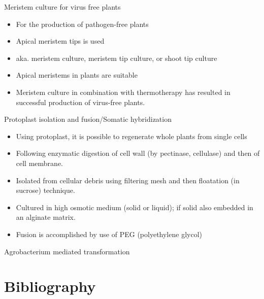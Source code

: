 \documentclass[ignorenonframetext,aspectratio=169]{beamer}
\providecommand{\tightlist}{%
  \setlength{\itemsep}{0pt}\setlength{\parskip}{0pt}}
\begin{document}
\begin{frame}{Meristem culture for virus free plants}
\protect\hypertarget{meristem-culture-for-virus-free-plants}{}

\begin{itemize}
\tightlist
\item
  For the production of pathogen-free plants
\item
  Apical meristem tips is used
\item
  aka. meristem culture, meristem tip culture, or shoot tip culture
\item
  Apical meristems in plants are suitable
\item
  Meristem culture in combination with thermotherapy has resulted in
  successful production of virus-free plants.
\end{itemize}

\end{frame}

\begin{frame}{Protoplast isolation and fusion/Somatic hybridization}
\protect\hypertarget{protoplast-isolation-and-fusionsomatic-hybridization}{}

\begin{itemize}
\tightlist
\item
  Using protoplast, it is possible to regenerate whole plants from
  single cells
\item
  Following enzymatic digestion of cell wall (by pectinase, cellulase)
  and then of cell membrane.
\item
  Isolated from cellular debris using filtering mesh and then floatation
  (in sucrose) technique.
\item
  Cultured in high osmotic medium (solid or liquid); if solid also
  embedded in an alginate matrix.
\item
  Fusion is accomplished by use of PEG (polyethylene glycol)
\end{itemize}

\end{frame}

\begin{frame}{Agrobacterium mediated transformation}
\protect\hypertarget{agrobacterium-mediated-transformation}{}

\end{frame}

\hypertarget{bibliography}{%
\section{Bibliography}\label{bibliography}}
\end{document}
